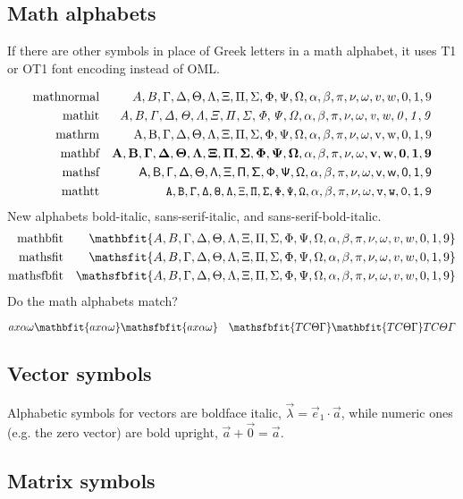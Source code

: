 \newcommand{\teststring}{%
A,B,
\Gamma,\Delta,\Theta,\Lambda,\Xi,\Pi,\Sigma,\Phi,\Psi,\Omega,
\alpha,\beta,\pi,\nu,\omega,
v,w,
0,1,9
}


\subsection*{Math alphabets}

If there are other symbols in place of Greek letters in a math
alphabet, it uses T1 or OT1 font encoding instead of OML.

\begin{eqnarray*}
\mbox{mathnormal} &  & \teststring \\
\mbox{mathit} &  & \mathit{\teststring}\\
\mbox{mathrm} &  & \mathrm{\teststring}\\
\mbox{mathbf} &  & \mathbf{\teststring}\\
\mbox{mathsf} &  & \mathsf{\teststring}\\
\mbox{mathtt} &  & \mathtt{\teststring}
\end{eqnarray*}
 New alphabets bold-italic, sans-serif-italic, and sans-serif-bold-italic.
\begin{eqnarray*}
\mbox{mathbfit}     &  & \mathbfit{\teststring}\\
\mbox{mathsfit}     &  & \mathsfit{\teststring}\\
\mbox{mathsfbfit} &  & \mathsfbfit{\teststring}
\end{eqnarray*}
%
Do the math alphabets match?

$
\mathnormal  {a x \alpha \omega}
\mathbfit    {a x \alpha \omega}
\mathsfbfit{a x \alpha \omega}
\quad
\mathsfbfit{T C \Theta \Gamma}
\mathbfit    {T C \Theta \Gamma}
\mathnormal  {T C \Theta \Gamma}
$

\subsection*{Vector symbols}

Alphabetic symbols for vectors are boldface italic,
$\vec{\lambda}=\vec{e}_{1}\cdot\vec{a}$,
while numeric ones (e.g. the zero vector) are bold upright,
$\vec{a} + \vec{0} = \vec{a}$.

\subsection*{Matrix symbols}

